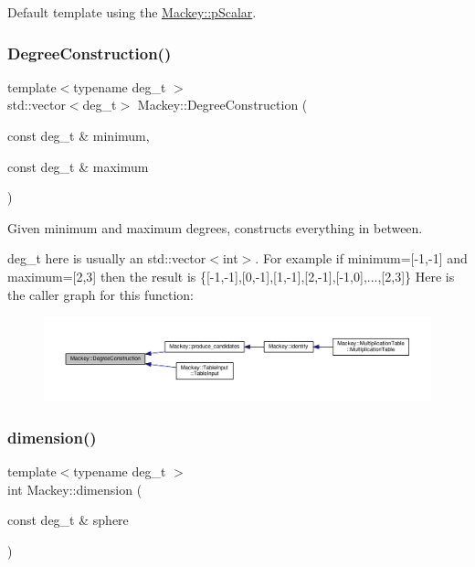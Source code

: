 Default template using the \hyperlink{namespaceMackey_a4f147e328c520f568f5d3adf1c75f514}{Mackey\+::p\+Scalar}. \mbox{\label{namespaceMackey_a49fef6f64b67ff118d35ac45b9c92972}} 
\subsubsection{\texorpdfstring{Degree\+Construction()}{DegreeConstruction()}}
{\footnotesize\ttfamily template$<$typename deg\+\_\+t $>$ \\
std\+::vector$<$deg\+\_\+t$>$ Mackey\+::\+Degree\+Construction (\begin{DoxyParamCaption}\item[{const deg\+\_\+t \&}]{minimum,  }\item[{const deg\+\_\+t \&}]{maximum }\end{DoxyParamCaption})}



Given minimum and maximum degrees, constructs everything in between. 

deg\+\_\+t here is usually an std\+::vector$<$int$>$. For example if minimum=\mbox{[}-\/1,-\/1\mbox{]} and maximum=\mbox{[}2,3\mbox{]} then the result is \{\mbox{[}-\/1,-\/1\mbox{]},\mbox{[}0,-\/1\mbox{]},\mbox{[}1,-\/1\mbox{]},\mbox{[}2,-\/1\mbox{]},\mbox{[}-\/1,0\mbox{]},...,\mbox{[}2,3\mbox{]}\} Here is the caller graph for this function\+:\nopagebreak
\begin{figure}[H]
\begin{center}
\leavevmode
\includegraphics[width=350pt]{namespaceMackey_a49fef6f64b67ff118d35ac45b9c92972_icgraph}
\end{center}
\end{figure}
\mbox{\label{namespaceMackey_a6a5d40e69e5628ea84896ee43f4a91fa}} 
\subsubsection{\texorpdfstring{dimension()}{dimension()}}
{\footnotesize\ttfamily template$<$typename deg\+\_\+t $>$ \\
int Mackey\+::dimension (\begin{DoxyParamCaption}\item[{const deg\+\_\+t \&}]{sphere }\end{DoxyParamCaption})\hspace{0.3cm}{\ttfamily [inline]}}



